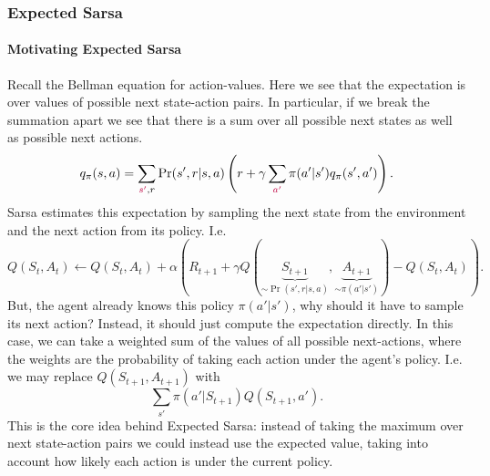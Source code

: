 \documentclass[12pt]{article}
\begin{document}
\subsubsection{Expected Sarsa}
\paragraph{Motivating Expected Sarsa} Recall the Bellman equation for action-values. Here we see that the expectation is over values of possible next state-action pairs. In particular, if we break the summation apart we see that there is a sum over all possible next states as well as possible next actions.
\[
  q_\pi(s,a) = \sum_{{\color{purple} s'}, r} \Pr(s', r| s, a) \left( r + \gamma \sum_{\color{purple} a'} \pi(a'|s') q_\pi(s',a')\right).
\]
Sarsa estimates this expectation by sampling the next state from the environment and the next action from its policy. I.e.
\[
  Q(S_t, A_t) \gets Q(S_t, A_t) + \alpha \left( R_{t+1} + \gamma Q(\underbrace{S_{t+1}}_{\sim \Pr(s', r | s, a)}, \underbrace{A_{t+1}}_{\sim \pi(a'|s')}) - Q(S_t, A_t)\right).
\]
But, the agent already knows this policy $\pi(a'|s')$, why should it have to sample its next action? Instead, it should just compute the expectation directly. In this case, we can take a weighted sum of the values of all possible next-actions, where the weights are the probability of taking each action under the agent's policy. I.e. we may replace $Q(S_{t+1}, A_{t+1})$ with
\[
  \sum_{s'} \pi(a'|S_{t+1}) Q(S_{t+1}, a').
\]
This is the core idea behind Expected Sarsa: instead of taking the maximum over next state-action pairs we could instead use the expected value, taking into account how likely each action is under the current policy.
\end{document}
